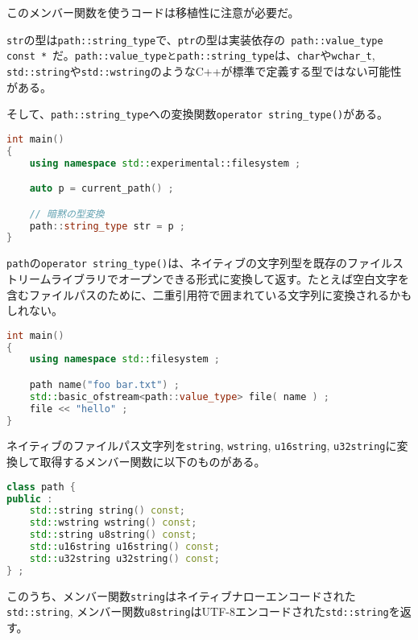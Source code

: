 このメンバー関数を使うコードは移植性に注意が必要だ。

\lstinline!str!の型は\lstinline!path::string_type!で、\lstinline!ptr!の型は実装依存の~\lstinline[breaklines=true]!path::value_type const *!~だ。\lstinline!path::value_typeとpath::string_type!は、\lstinline!char!や\lstinline!wchar_t!,
\lstinline!std::string!や\lstinline!std::wstring!のようなC++が標準で定義する型ではない可能性がある。

そして、\lstinline!path::string_type!への変換関数\lstinline!operator string_type()!がある。

\begin{lstlisting}[language=C++]
int main()
{
    using namespace std::experimental::filesystem ;

    auto p = current_path() ;

    // 暗黙の型変換
    path::string_type str = p ;
}
\end{lstlisting}

\lstinline!path!の\lstinline!operator string_type()!は、ネイティブの文字列型を既存のファイルストリームライブラリでオープンできる形式に変換して返す。たとえば空白文字を含むファイルパスのために、二重引用符で囲まれている文字列に変換されるかもしれない。

\begin{lstlisting}[language=C++]
int main()
{
    using namespace std::filesystem ;

    path name("foo bar.txt") ;
    std::basic_ofstream<path::value_type> file( name ) ;
    file << "hello" ;
}
\end{lstlisting}

ネイティブのファイルパス文字列を\lstinline!string!, \lstinline!wstring!,
\lstinline!u16string!,
\lstinline!u32string!に変換して取得するメンバー関数に以下のものがある。

\begin{lstlisting}[language=C++]
class path {
public :
    std::string string() const;
    std::wstring wstring() const;
    std::string u8string() const;
    std::u16string u16string() const;
    std::u32string u32string() const;
} ;
\end{lstlisting}

このうち、メンバー関数\lstinline!string!はネイティブナローエンコードされた\lstinline!std::string!,
メンバー関数\lstinline!u8string!はUTF-8エンコードされた\lstinline!std::string!を返す。

